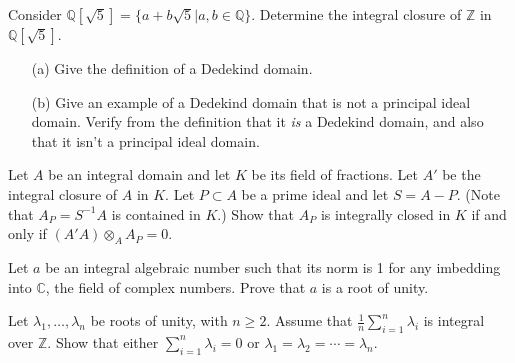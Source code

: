 \begin{prob}[F2009-Q2]
    Consider \(\mathbb{Q}[\sqrt{5}] = \{a + b\sqrt{5}|a,b \in \mathbb{Q}\}\). Determine the integral closure of \(\mathbb{Z}\) in \(\mathbb{Q}[\sqrt{5}]\).
\end{prob}

\begin{prob}[S2012-Q5]
    \phantom{text}
    \begin{itemize}
        \item[(a)] Give the definition of a Dedekind domain.
        \item[(b)] Give an example of a Dedekind domain that is not a principal ideal domain. Verify from the definition that it \textit{is} a Dedekind domain, and also that it isn't a principal ideal domain.
    \end{itemize}
\end{prob}


\begin{prob}[S2005-Q5]
    Let \(A\) be an integral domain and let \(K\) be its field of fractions. Let \(A'\) be the integral closure of \(A\) in \(K\). Let \(P \subset A\) be a prime ideal and let \(S = A - P\). (Note that \(A_P = S^{-1}A\) is contained in \(K\).) Show that \(A_P\) is integrally closed in \(K\) if and only if \((A'A) \otimes_A A_P = 0\).
\end{prob}


\begin{prob}[F2013-Q2]
    Let \(a\) be an integral algebraic number such that its norm is 1 for any imbedding into \(\mathbb{C}\), the field of complex numbers. Prove that \(a\) is a root of unity.
\end{prob}

\begin{prob}[F2004-Q4]
    Let \(\lambda_1, \ldots, \lambda_n\) be roots of unity, with \(n \geq 2\). Assume that \(\frac{1}{n} \sum_{i=1}^n \lambda_i\) is integral over \(\mathbb{Z}\). Show that either \(\sum_{i=1}^n \lambda_i = 0\) or \(\lambda_1 = \lambda_2 = \cdots = \lambda_n\).
\end{prob}













